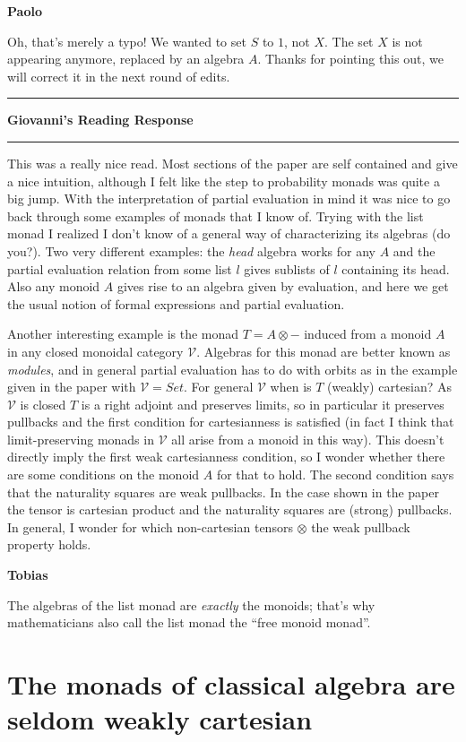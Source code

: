 \documentclass{amsart}
\newcommand{\iam}[1]{
  \vspace{0.25em}
  \hrule
  \vspace{0.25em}
  \textbf{{#1}'s Reading Response}
  \vspace{0.25em}
  \hrule
  \vspace{1em}
}
\newcommand{\respond}[1]{
  \vspace{1em} \textbf{#1}
}
\begin{document}
\respond{Paolo}
Oh, that's merely a typo! We wanted to set $S$ to $1$, not $X$. The set $X$ is not appearing anymore, replaced by an algebra $A$. Thanks for pointing this out, we will correct it in the next round of edits.


\iam{Giovanni}
This was a really nice read. Most sections of the paper are self contained and give a nice intuition, although I felt like the step to probability monads was quite a big jump. With the interpretation of partial evaluation in mind it was nice to go back through some examples of monads that I know of. Trying with the list monad I realized I don't know of a general way of characterizing its algebras (do you?). Two very different examples: the \emph{head} algebra works for any $A$ and the partial evaluation relation from some list $l$ gives sublists of $l$ containing its head. Also any monoid $A$ gives rise to an algebra given by evaluation, and here we get the usual notion of formal expressions and partial evaluation.

Another interesting example is the monad $T = A \otimes - $ induced from a monoid $A$ in any closed monoidal category $\mathcal{V}$. Algebras for this monad are better known as \emph{modules}, and in general partial evaluation has to do with orbits as in the example given in the paper with $\mathcal{V} = Set$. For general $\mathcal{V}$ when is $T$ (weakly) cartesian?
As $\mathcal{V}$ is closed $T$ is a right adjoint and preserves limits, so in particular it preserves pullbacks and the first condition for cartesianness is satisfied (in fact I think that limit-preserving monads in $\mathcal{V}$ all arise from a monoid in this way). This doesn't directly imply the first weak cartesianness condition, so I wonder whether there are some conditions on the monoid $A$ for that to hold.
The second condition says that the naturality squares are weak pullbacks. In the case shown in the paper the tensor is cartesian product and the naturality squares are (strong) pullbacks. In general, I wonder for which non-cartesian tensors $\otimes$ the weak pullback property holds.

\respond{Tobias}

The algebras of the list monad are \emph{exactly} the monoids; that's why mathematicians also call the list monad the ``free monoid monad''.




\section{The monads of classical algebra are seldom weakly
  cartesian}
\label{sec:weakly-cart}
\end{document}
